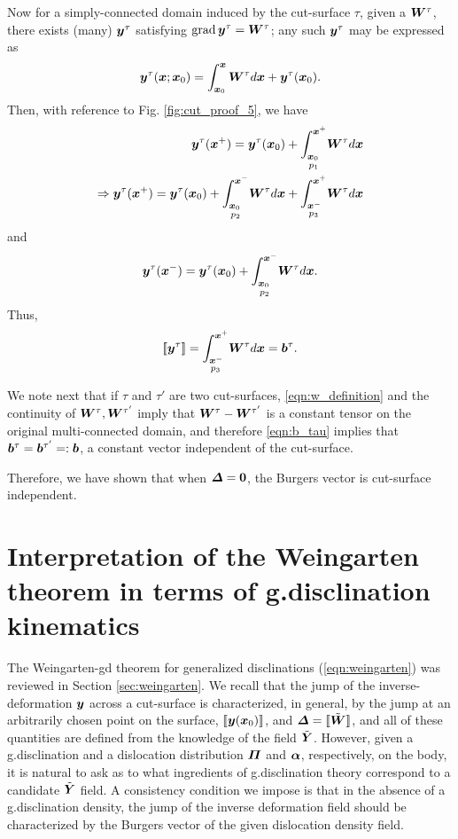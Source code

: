 \documentclass[11pt,letterpaper]{article}
\begin{document}
Now for a simply-connected domain induced by the cut-surface $\tau$, given a $\bfW^\tau$, there exists (many) $\bfy^\tau$ satisfying $\grad \bfy^\tau = \bfW^\tau$; any such $\bfy^\tau$ may be expressed as 
\begin{equation*}
\bfy^\tau(\bfx;\bfx_0) = \int_{\bfx_0}^{\bfx} \bfW^\tau d\bfx + \bfy^{\tau}(\bfx_0).
\end{equation*}
Then, with reference to Fig. \ref{fig:cut_proof_5}, we have
\begin{align*}
\bfy^\tau(\bfx^+) = \bfy^\tau(\bfx_0) + \underset{p_1} {\int_{\bfx_0}^{\bfx^+}} \bfW^\tau d\bfx \\
\Rightarrow \bfy^\tau(\bfx^+) = {\bfy^\tau}(\bfx_0) + \underset{p_2} {\int_{\bfx_0}^{\bfx^-}}\bfW^\tau d\bfx + \underset{p_3} {\int_{\bfx^-}^{\bfx^+}} \bfW^\tau d\bfx
\end{align*}
and 
\begin{equation*}
\bfy^\tau(\bfx^-) = \bfy^\tau(\bfx_0) + \underset{p_2} {\int_{\bfx_0}^{\bfx^-}} \bfW^\tau d\bfx.
\end{equation*}
Thus,
\begin{equation}\label{eqn:b_tau}
[\![ {\bfy^\tau}]\!] =\underset{p_3}{\int_{\bfx^-}^{\bfx^+}}\bfW^\tau d\bfx = \bfb^\tau.
\end{equation}

We note next that if $\tau$ and $\tau'$ are two cut-surfaces, \eqref{eqn:w_definition} and the continuity of $\bfW^{\tau}, \bfW^{\tau'}$ imply that $\bfW^{\tau} -\bfW^{\tau'}$ is a constant tensor on the original multi-connected domain, and therefore \eqref{eqn:b_tau} implies that $\bfb^\tau = \bfb^{\tau'} =:\bfb$, a constant vector independent of the cut-surface.

Therefore, we have shown that when $\bfDelta=\bf0$, the Burgers vector is cut-surface independent.



 \section{Interpretation of the Weingarten theorem in terms of g.disclination kinematics}\label{sec:rel_gdisclin_wein}
 
The Weingarten-gd theorem for generalized disclinations (\ref{eqn:weingarten}) was reviewed in Section \ref{sec:weingarten}. We recall that the jump of the inverse-deformation $\bfy$ across a cut-surface is characterized, in general, by the jump at an arbitrarily chosen point on the surface, $\llbracket \bfy(\bfx_0) \rrbracket$, and $\bfDelta = \llbracket \tilde{\bfW} \rrbracket$, and all of these quantities are defined from the knowledge of the field $\tilde{\bfY}$. However, given a g.disclination and a dislocation distribution $\bfPi$ and $\bfalpha$, respectively, on the body, it is natural to ask as to what ingredients of g.disclination theory correspond to a candidate $\tilde{\bfY}$ field. A consistency condition we impose is that in the absence of a g.disclination density, the jump of the inverse deformation field should be characterized by the Burgers vector of the given dislocation density field.
 
\end{document}
